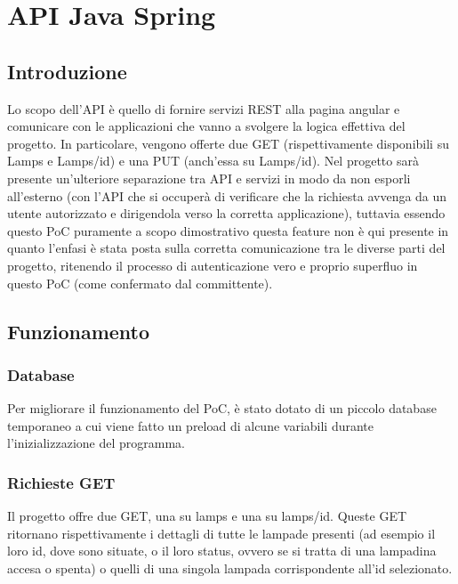 \chapter{API Java Spring}\label{funzionamento}

\section{Introduzione}

Lo scopo dell'API è quello di fornire servizi REST alla pagina angular e comunicare con le applicazioni che vanno a svolgere la logica effettiva del progetto. In particolare, vengono offerte due GET (rispettivamente disponibili su Lamps e Lamps/id) e una PUT (anch'essa su Lamps/id). Nel progetto sarà presente un'ulteriore separazione tra API e servizi in modo da non esporli all'esterno (con l'API che si occuperà di verificare che la richiesta avvenga da un utente autorizzato e dirigendola verso la corretta applicazione), tuttavia essendo questo PoC puramente a scopo dimostrativo questa feature non è qui presente in quanto l'enfasi è stata posta sulla corretta comunicazione tra le diverse parti del progetto, ritenendo il processo di autenticazione vero e proprio superfluo in questo PoC (come confermato dal committente).

\section{Funzionamento}

\subsection{Database}

Per migliorare il funzionamento del PoC, è stato dotato di un piccolo database temporaneo a cui viene fatto un preload di alcune variabili durante l'inizializzazione del programma.

\subsection{Richieste GET}

Il progetto offre due GET, una su lamps e una su lamps/id. Queste GET ritornano rispettivamente i dettagli di tutte le lampade presenti (ad esempio il loro id, dove sono situate, o il loro status, ovvero se si tratta di una lampadina accesa o spenta) o quelli di una singola lampada corrispondente all'id selezionato.


